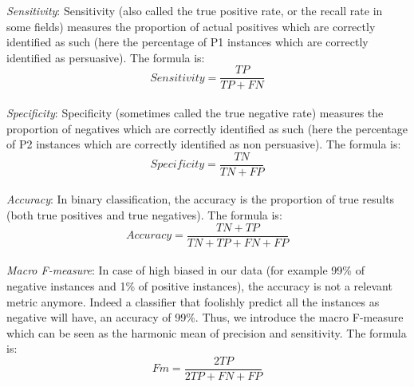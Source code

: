 \textit{Sensitivity}: Sensitivity (also called the true positive rate, or the recall rate in some fields) measures the proportion of actual positives which are correctly identified as such (here the percentage of P1 instances which are correctly identified as persuasive). The formula is:
\begin{equation*}
Sensitivity = \frac{TP}{TP + FN}
\end{equation*}
\\

\textit{Specificity}:  Specificity (sometimes called the true negative rate) measures the proportion of negatives which are correctly identified as such (here the percentage of P2 instances which are correctly identified as non persuasive). The formula is:
\begin{equation*}
Specificity = \frac{TN}{TN + FP}
\end{equation*}
\\

\textit{Accuracy}: In binary classification, the accuracy is the proportion of true results (both true positives and true negatives). The formula is:
\begin{equation*}
Accuracy = \frac{TN + TP}{TN + TP + FN + FP}
\end{equation*}
\\

\textit{Macro F-measure}: In case of high biased in our data (for example 99\% of negative instances and 1\% of positive instances), the accuracy is not a relevant metric anymore. Indeed a classifier that foolishly predict all the instances as negative will have, an accuracy of 99\%. Thus, we introduce the macro F-measure which can be seen as the harmonic mean of precision and sensitivity. The formula is:
\begin{equation*}
Fm = \frac{2 TP}{2 TP + FN + FP}
\end{equation*}